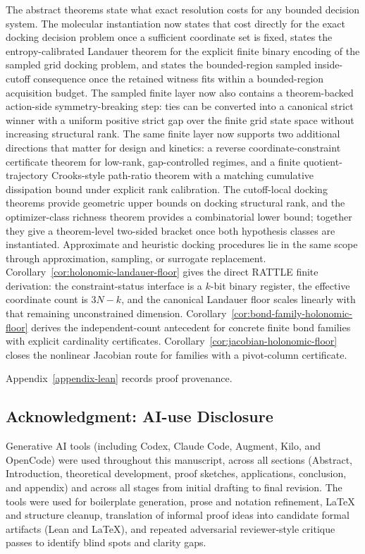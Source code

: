 The abstract theorems state what exact resolution costs for any bounded decision system. The molecular instantiation now states that cost directly for the exact docking decision problem once a sufficient coordinate set is fixed, states the entropy-calibrated Landauer theorem for the explicit finite binary encoding of the sampled grid docking problem, and states the bounded-region sampled inside-cutoff consequence once the retained witness fits within a bounded-region acquisition budget. The sampled finite layer now also contains a theorem-backed action-side symmetry-breaking step: ties can be converted into a canonical strict winner with a uniform positive strict gap over the finite grid state space without increasing structural rank. The same finite layer now supports two additional directions that matter for design and kinetics: a reverse coordinate-constraint certificate theorem for low-rank, gap-controlled regimes, and a finite quotient-trajectory Crooks-style path-ratio theorem with a matching cumulative dissipation bound under explicit rank calibration. The cutoff-local docking theorems provide geometric upper bounds on docking structural rank, and the optimizer-class richness theorem provides a combinatorial lower bound; together they give a theorem-level two-sided bracket once both hypothesis classes are instantiated. Approximate and heuristic docking procedures lie in the same scope through approximation, sampling, or surrogate replacement. Corollary~\ref{cor:holonomic-landauer-floor} gives the direct RATTLE finite derivation: the constraint-status interface is a $k$-bit binary register, the effective coordinate count is $3N-k$, and the canonical Landauer floor scales linearly with that remaining unconstrained dimension. Corollary~\ref{cor:bond-family-holonomic-floor} derives the independent-count antecedent for concrete finite bond families with explicit cardinality certificates. Corollary~\ref{cor:jacobian-holonomic-floor} closes the nonlinear Jacobian route for families with a pivot-column certificate.

Appendix~\ref{appendix-lean} records proof provenance.


\subsection*{Acknowledgment: AI-use Disclosure}

Generative AI tools (including Codex, Claude Code, Augment, Kilo, and OpenCode) were used throughout this manuscript, across all sections (Abstract, Introduction, theoretical development, proof sketches, applications, conclusion, and appendix) and across all stages from initial drafting to final revision. The tools were used for boilerplate generation, prose and notation refinement, LaTeX and structure cleanup, translation of informal proof ideas into candidate formal artifacts (Lean and LaTeX), and repeated adversarial reviewer-style critique passes to identify blind spots and clarity gaps.


